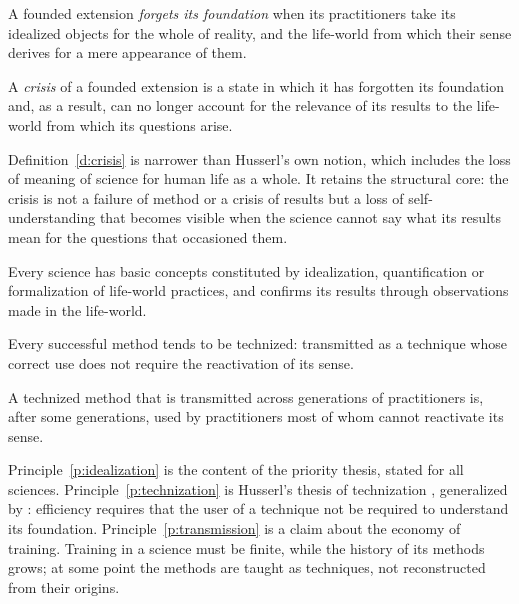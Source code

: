 \documentclass{situationist-preprint}
\begin{document}
\begin{definition}\label{d:forgetting}
A founded extension \emph{forgets its foundation} when its practitioners take its idealized objects for the whole of reality, and the life-world from which their sense derives for a mere appearance of them.
\end{definition}

\begin{definition}\label{d:crisis}
A \emph{crisis} of a founded extension is a state in which it has forgotten its foundation and, as a result, can no longer account for the relevance of its results to the life-world from which its questions arise.
\end{definition}

Definition~\ref{d:crisis} is narrower than Husserl's own notion, which includes the loss of meaning of science for human life as a whole. It retains the structural core: the crisis is not a failure of method or a crisis of results but a loss of self-understanding that becomes visible when the science cannot say what its results mean for the questions that occasioned them.

\begin{principle}\label{p:idealization}
Every science has basic concepts constituted by idealization, quantification or formalization of life-world practices, and confirms its results through observations made in the life-world.
\end{principle}

\begin{principle}\label{p:technization}
Every successful method tends to be technized: transmitted as a technique whose correct use does not require the reactivation of its sense.
\end{principle}

\begin{principle}\label{p:transmission}
A technized method that is transmitted across generations of practitioners is, after some generations, used by practitioners most of whom cannot reactivate its sense.
\end{principle}

Principle~\ref{p:idealization} is the content of the priority thesis, stated for all sciences. Principle~\ref{p:technization} is Husserl's thesis of technization \citep[§9g]{Husserl1954}, generalized by \citet{Blumenberg1981}: efficiency requires that the user of a technique not be required to understand its foundation. Principle~\ref{p:transmission} is a claim about the economy of training. Training in a science must be finite, while the history of its methods grows; at some point the methods are taught as techniques, not reconstructed from their origins.
\end{document}
